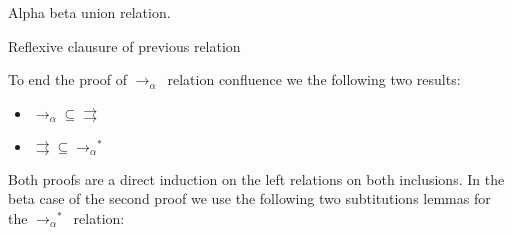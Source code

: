 \documentclass{article}
\newcommand{\p}{\ensuremath{\rightrightarrows}}
\newcommand{\betaalpha}{\ensuremath{\rightarrow_\alpha}}
\begin{document}

Alpha beta union relation.


Reflexive clausure of previous relation


To end the proof of \betaalpha\ relation confluence we the following two results:

\begin{itemize}
\item $\betaalpha \subseteq \p$
\item $\p \subseteq \betaalpha^*$
\end{itemize}

Both proofs are a direct induction on the left relations on both inclusions. In the beta case of the second proof we use the following two subtitutions lemmas for the $\betaalpha^*$\ relation:

\end{document}
